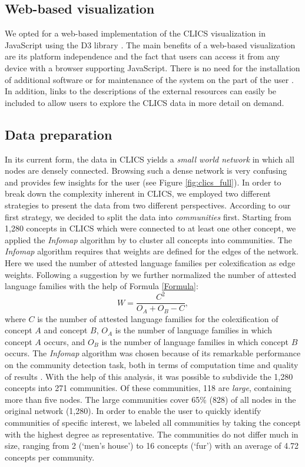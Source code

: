 \subsection{Web-based visualization}

We opted for a web-based implementation of the CLICS visualization in JavaScript using the D3 library \cite{D3}. The main benefits of a web-based visualization are its platform independence and the fact that users can access it from any device with a browser supporting JavaScript. There is no need for the installation of additional software or for maintenance of the system on the part of the user \cite{Murray}. In addition, links to the descriptions of the external resources can easily be included to allow users to explore the CLICS data in more detail on demand. 

\subsection{Data preparation}
In its current form, the data in CLICS yields a \emph{small world network} in which all nodes are
densely connected. Browsing such a dense network is very confusing and provides few insights for
the user (see Figure \ref{fig:clics_full}). In order to break down the complexity inherent in CLICS,
we employed two different strategies to present the data from two different perspectives. 
According to our first strategy, we decided to split the data
into \emph{communities} first. 
Starting from 1,280 concepts in CLICS which
were connected to at least one other concept, we applied the \emph{Infomap} algorithm by
 to cluster all concepts into communities.
The \emph{Infomap} algorithm requires that weights are defined for the edges of the network.
Here we used the number of attested language families per colexification as edge weights. Following
a suggestion by  we
further normalized the number of attested language families with the help of Formula \ref{Formula}:
\begin{equation} \label{Formula}
    W = \frac{C^2}{O_A+O_B - C},
\end{equation}
where $C$ is the number of attested language families for the colexification of concept $A$ and
concept $B$, $O_A$ is the number of language families in which concept $A$ occurs, and $O_B$ is the
number of language families in which concept $B$ occurs. 
The \emph{Infomap} algorithm was chosen because of
its remarkable performance on the community detection task, both in terms of computation time and
quality of results \cite{Lancichinetti2009}.
With the help of this analysis, it was possible to subdivide the 1,280 concepts into 271 communities. 
Of these communities, 118 are \emph{large}, containing more than
five nodes. The large communities cover 65\% (828) of all nodes in the original network (1,280). In
order to enable the user to quickly identify communities of specific interest, we labeled all
communities by taking the concept with the highest degree as representative. 
The communities do not differ much in size, ranging from 2 (`men's house') to 16 concepts (`{fur}')
with an average of 4.72 concepts per community.
 
